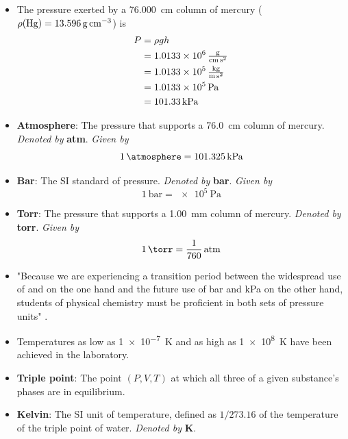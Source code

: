 \documentclass[../notes.tex]{subfiles}
\begin{document}
\begin{itemize}
\begin{equation*}
    \end{equation*}
    \item The pressure exerted by a \SI{76.000}{\centi\meter} column of mercury ($\rho(\ce{Hg})=\SI{13.596}{\gram\per\cubic\centi\meter}$) is
    \begin{align*}
        P &= \rho gh\\
        &= \SI[per-mode=fraction,fraction-function=\tfrac]{1.0133e6}{\gram\per\centi\meter\per\square\second}\\
        &= \SI[per-mode=fraction,fraction-function=\tfrac]{1.0133e5}{\kilo\gram\per\meter\per\square\second}\\
        &= \SI{1.0133e5}{\pascal}\\
        &= \SI{101.33}{\kilo\pascal}
    \end{align*}
    \item \textbf{Atmosphere}: The pressure that supports a \SI{76.0}{\centi\meter} column of mercury. \emph{Denoted by} \textbf{atm}. \emph{Given by}
    \begin{equation*}
        \SI{1}{\atmosphere} = \SI{101.325}{\kilo\pascal}
    \end{equation*}
    \item \textbf{Bar}: The SI standard of pressure. \emph{Denoted by} \textbf{bar}. \emph{Given by}
    \begin{equation*}
        \SI{1}{\bar} = \SI{e5}{\pascal}
    \end{equation*}
    \item \textbf{Torr}: The pressure that supports a \SI{1.00}{\milli\meter} column of mercury. \emph{Denoted by} \textbf{torr}. \emph{Given by}
    \begin{equation*}
        \SI{1}{\torr} = \frac{1}{760}\,\text{atm}
    \end{equation*}
    \item "Because we are experiencing a transition period between the widespread use of \si{\atmosphere} and \si{\torr} on the one hand and the future use of \si{\bar} and \si{\kilo\pascal} on the other hand, students of physical chemistry must be proficient in both sets of pressure units" \parencite[639]{bib:McQuarrieSimon}.
    \item Temperatures as low as \SI{1e-7}{\kelvin} and as high as \SI{1e8}{\kelvin} have been achieved in the laboratory.
    \item \textbf{Triple point}: The point $(P,V,T)$ at which all three of a given substance's phases are in equilibrium.
    \item \textbf{Kelvin}: The SI unit of temperature, defined as $1/273.16$ of the temperature of the triple point of water. \emph{Denoted by} \textbf{K}.

\end{itemize}
\end{document}
